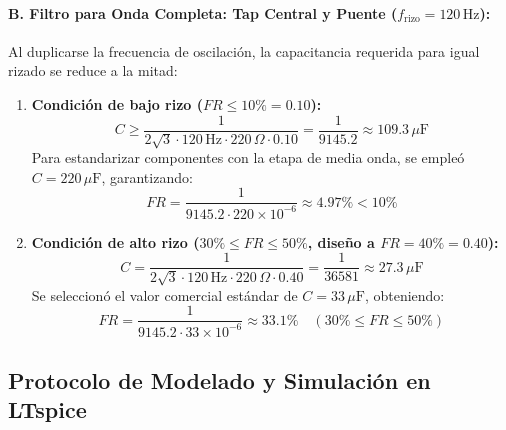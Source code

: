 \paragraph{B. Filtro para Onda Completa: Tap Central y Puente ($f_{\mathrm{rizo}} = 120\,\mathrm{Hz}$):}
Al duplicarse la frecuencia de oscilación, la capacitancia requerida para igual rizado se reduce a la mitad:
\begin{enumerate}
    \item \textbf{Condición de bajo rizo ($FR \le 10\% = 0.10$):}
    \begin{equation}
        C \ge \frac{1}{2\sqrt{3} \cdot 120\,\mathrm{Hz} \cdot 220\,\Omega \cdot 0.10} = \frac{1}{9145.2} \approx 109.3\,\mu\mathrm{F}
    \end{equation}
    Para estandarizar componentes con la etapa de media onda, se empleó \textbf{$C = 220\,\mu\mathrm{F}$}, garantizando:
    \begin{equation}
        FR = \frac{1}{9145.2 \cdot 220 \times 10^{-6}} \approx \mathbf{4.97\%} < 10\%
    \end{equation}
    \item \textbf{Condición de alto rizo ($30\% \le FR \le 50\%$, diseño a $FR = 40\% = 0.40$):}
    \begin{equation}
        C = \frac{1}{2\sqrt{3} \cdot 120\,\mathrm{Hz} \cdot 220\,\Omega \cdot 0.40} = \frac{1}{36581} \approx 27.3\,\mu\mathrm{F}
    \end{equation}
    Se seleccionó el valor comercial estándar de \textbf{$C = 33\,\mu\mathrm{F}$}, obteniendo:
    \begin{equation}
        FR = \frac{1}{9145.2 \cdot 33 \times 10^{-6}} \approx \mathbf{33.1\%} \quad (30\% \le FR \le 50\%)
    \end{equation}
\end{enumerate}

\subsection{Protocolo de Modelado y Simulación en LTspice}

